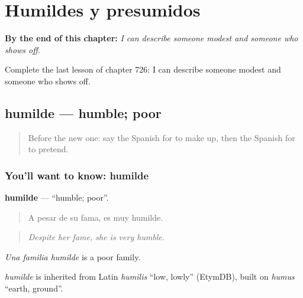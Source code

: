 
\chapter{Humildes y presumidos}
\label{ch:es-humildes-y-presumidos}

\begin{chapteropening}
\textbf{By the end of this chapter:} \emph{I can describe someone modest and someone who shows off.}

Complete the last lesson of chapter 726: I can describe someone modest and someone who shows off.
\end{chapteropening}

\section[humilde]{humilde — humble; poor}

\label{lesson:ES-C726-humilde}



\begin{quote}
Before the new one: say the Spanish for to make up, then the Spanish for to pretend.
\end{quote}

\subsection*{You'll want to know: humilde}
\textbf{humilde} — \textquotedblleft{}humble; poor\textquotedblright{}.

\begin{quote}
A pesar de su fama, es muy humilde.
\end{quote}

\begin{quote}
\emph{Despite her fame, she is very humble.}
\end{quote}

\emph{Una familia humilde} is a poor family.

\begin{cousinweb}
\emph{humilde} is inherited from Latin \emph{humilis} \textquotedblleft{}low, lowly\textquotedblright{} (EtymDB), built on \emph{humus} \textquotedblleft{}earth, ground\textquotedblright{}.
\end{cousinweb}

